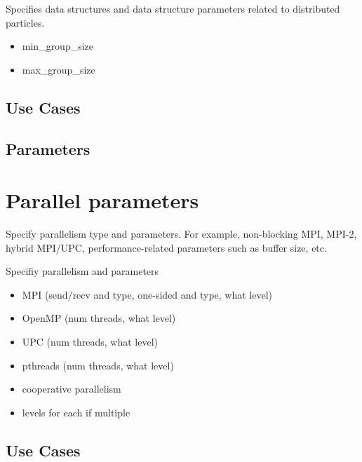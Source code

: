 \documentclass{book}
\begin{document}
Specifies data structures and data structure parameters related
to distributed particles.  

\begin{itemize}
\item min\_group\_size
\item max\_group\_size
\end{itemize}

\subsection{Use Cases}
\subsection{Parameters}

\section{Parallel parameters} \label{s:parallel}

Specify parallelism type and parameters.  For example, non-blocking
MPI, MPI-2, hybrid MPI/UPC, performance-related parameters such as
buffer size, etc.

Specifiy parallelism and parameters

\begin{itemize}
\item MPI (send/recv and type, one-sided and type, what level)
\item OpenMP (num threads, what level)
\item UPC (num threads, what level)
\item pthreads (num threads, what level)
\item cooperative parallelism
\item levels for each if multiple
\end{itemize}

\subsection{Use Cases}
\end{document}
